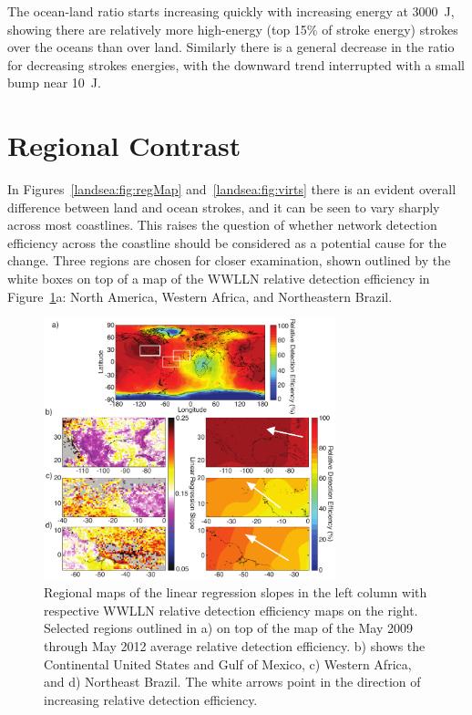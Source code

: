 The ocean-land ratio starts increasing quickly with increasing energy at 3000~J, showing there are relatively more high-energy (top 15\% of stroke energy) strokes over the oceans than over land.
Similarly there is a general decrease in the ratio for decreasing strokes energies, with the downward trend interrupted with a small bump near 10~J.

\section{Regional Contrast}

In Figures~\ref{landsea:fig:regMap} and~\ref{landsea:fig:virts} there is an evident overall difference between land and ocean strokes, and it can be seen to vary sharply across most coastlines.
This raises the question of whether network detection efficiency across the coastline should be considered as a potential cause for the change.
Three regions are chosen for closer examination, shown outlined by the white boxes on top of a map of the WWLLN relative detection efficiency in Figure~\ref{landsea:fig:wwlln_regional}a: North America, Western Africa, and Northeastern Brazil. 

\begin{figure}[ht!]
   \centering
   \noindent\includegraphics[width=20pc]{LandSea/Figures/6_wwlln_regional.pdf} 
   \caption{Regional maps of the linear regression slopes in the left column with respective WWLLN relative detection efficiency maps on the right. Selected regions outlined in a) on top of the map of the May 2009 through May 2012 average relative detection efficiency. b) shows the Continental United States and Gulf of Mexico, c) Western Africa, and d) Northeast Brazil. The white arrows point in the direction of increasing relative detection efficiency.}
   \label{landsea:fig:wwlln_regional}
\end{figure}


